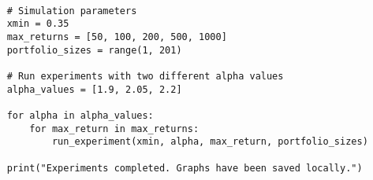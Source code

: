 \documentclass[a4paper, oneside]{discothesis}
\begin{document}
\begin{verbatim}
    
    # Simulation parameters
    xmin = 0.35
    max_returns = [50, 100, 200, 500, 1000]
    portfolio_sizes = range(1, 201)
    
    # Run experiments with two different alpha values
    alpha_values = [1.9, 2.05, 2.2]
    
    for alpha in alpha_values:
        for max_return in max_returns:
            run_experiment(xmin, alpha, max_return, portfolio_sizes)
    
    print("Experiments completed. Graphs have been saved locally.")
    
\end{verbatim}
\end{document}
